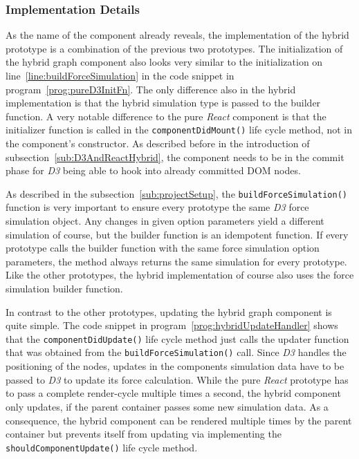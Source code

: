\subsubsection{Implementation Details}

As the name of the component already reveals, the implementation of the hybrid prototype is a combination of the previous two prototypes. The initialization of the hybrid graph component also looks very similar to the initialization on line~\ref{line:buildForceSimulation} in the code snippet in program~\ref{prog:pureD3InitFn}. The only difference also in the hybrid implementation is that the hybrid simulation type is passed to the builder function. A very notable difference to the pure \emph{React} component is that the initializer function is called in the \texttt{componentDidMount()} life cycle method, not in the component's constructor. As described before in the introduction of subsection~\ref{sub:D3AndReactHybrid}, the component needs to be in the commit phase for \emph{D3} being able to hook into already committed DOM nodes.

As described in the subsection~\ref{sub:projectSetup}, the \texttt{buildForceSimulation()} function is very important to ensure every prototype the same \emph{D3} force simulation object. Any changes in given option parameters yield a different simulation of course, but the builder function is an idempotent function. If every prototype calls the builder function with the same force simulation option parameters, the method always returns the same simulation for every prototype. Like the other prototypes, the hybrid implementation of course also uses the force simulation builder function.

In contrast to the other prototypes, updating the hybrid graph component is quite simple. The code snippet in program~\ref{prog:hybridUpdateHandler} shows that the \texttt{componentDidUpdate()} life cycle method just calls the updater function that was obtained from the \texttt{build\linebreak[0]{}Force\linebreak[0]{}Simulation()} call. Since \emph{D3} handles the positioning of the nodes, updates in the components simulation data have to be passed to \emph{D3} to update its force calculation. While the pure \emph{React} prototype has to pass a complete render-cycle multiple times a second, the hybrid component only updates, if the parent container passes some new simulation data. As a consequence, the hybrid component can be rendered multiple times by the parent container but prevents itself from updating via implementing the \texttt{shouldComponentUpdate()} life cycle method.

